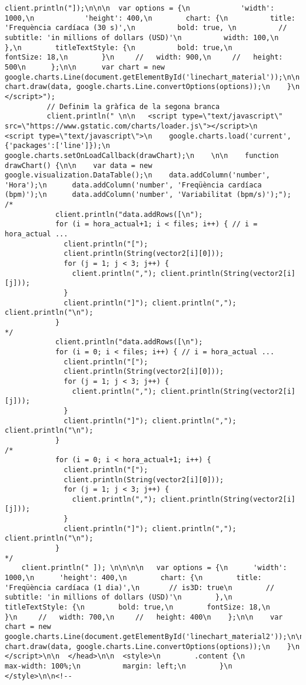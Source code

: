 \begin{lstlisting}[style=myArduino]
          client.println("]);\n\n\n  var options = {\n            'width': 1000,\n            'height': 400,\n        chart: {\n          title: 'Frequència cardíaca (30 s)',\n          bold: true, \n          // subtitle: 'in millions of dollars (USD)'\n          width: 100,\n        },\n        titleTextStyle: {\n          bold: true,\n          fontSize: 18,\n        }\n     //   width: 900,\n     //   height: 500\n      };\n\n      var chart = new google.charts.Line(document.getElementById('linechart_material'));\n\n      chart.draw(data, google.charts.Line.convertOptions(options));\n    }\n    </script>");
          // Definim la gràfica de la segona branca
          client.println(" \n\n   <script type=\"text/javascript\" src=\"https://www.gstatic.com/charts/loader.js\"></script>\n    <script type=\"text/javascript\">\n    google.charts.load('current', {'packages':['line']});\n    google.charts.setOnLoadCallback(drawChart);\n    \n\n    function drawChart() {\n\n    var data = new google.visualization.DataTable();\n    data.addColumn('number', 'Hora');\n      data.addColumn('number', 'Freqüència cardíaca (bpm)');\n      data.addColumn('number', 'Variabilitat (bpm/s)');");
/*           
            client.println("data.addRows([\n"); 
            for (i = hora_actual+1; i < files; i++) { // i = hora_actual ...
              client.println("[");
              client.println(String(vector2[i][0]));
              for (j = 1; j < 3; j++) {
                client.println(","); client.println(String(vector2[i][j]));
              }
              client.println("]"); client.println(","); client.println("\n");
            }
*/
            client.println("data.addRows([\n"); 
            for (i = 0; i < files; i++) { // i = hora_actual ...
              client.println("[");
              client.println(String(vector2[i][0]));
              for (j = 1; j < 3; j++) {
                client.println(","); client.println(String(vector2[i][j]));
              }
              client.println("]"); client.println(","); client.println("\n");
            }
/*
            for (i = 0; i < hora_actual+1; i++) {
              client.println("[");
              client.println(String(vector2[i][0]));
              for (j = 1; j < 3; j++) {
                client.println(","); client.println(String(vector2[i][j]));
              }
              client.println("]"); client.println(","); client.println("\n");
            }
*/
    client.println(" ]); \n\n\n\n   var options = {\n      'width': 1000,\n      'height': 400,\n        chart: {\n        title: 'Freqüència cardíaca (1 dia)',\n       // is3D: true\n        // subtitle: 'in millions of dollars (USD)'\n        },\n      titleTextStyle: {\n        bold: true,\n        fontSize: 18,\n      }\n     //   width: 700,\n     //   height: 400\n    };\n\n    var chart = new google.charts.Line(document.getElementById('linechart_material2'));\n\n    chart.draw(data, google.charts.Line.convertOptions(options));\n    }\n    </script>\n\n  </head>\n\n  <style>\n        .content {\n          max-width: 100%;\n          margin: left;\n        }\n   </style>\n\n<!--  

\end{lstlisting}
